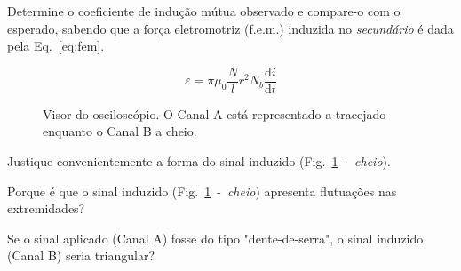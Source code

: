 \begin{parts}
\begin{subparts}
\subpart[30]
Determine o coeficiente de indu\c{c}\~{a}o m\'{u}tua observado e compare-o com o esperado, sabendo que a for\c{c}a eletromotriz (f.e.m.) induzida no \emph{secund\'{a}rio} \'{e} dada pela Eq.~\ref{eq:fem}.

\begin{equation}
\label{eq:fem}
\varepsilon=\pi\mu_0\frac{N}{l}r^2N_b\frac{\mathrm d i}{\mathrm d t}
\end{equation}

\begin{figure}[h]
\begin{center}
\caption{\label{fig:osci}Visor do oscilosc\'{o}pio. O Canal A est\'{a} representado a tracejado enquanto o Canal B a cheio.}
\end{center}
\end{figure}

\subpart[15]
Justique convenientemente a forma do sinal induzido (Fig.~\ref{fig:osci}~-~\textit{cheio}).

\subpart[10]
Porque \'{e} que o sinal induzido (Fig.~\ref{fig:osci}~-~\textit{cheio}) apresenta flutua\c{c}\~{o}es nas extremidades?

\subpart[10]
Se o sinal aplicado (Canal A) fosse do tipo "dente-de-serra", o sinal induzido (Canal B) seria triangular?

\end{subparts}
\end{parts}